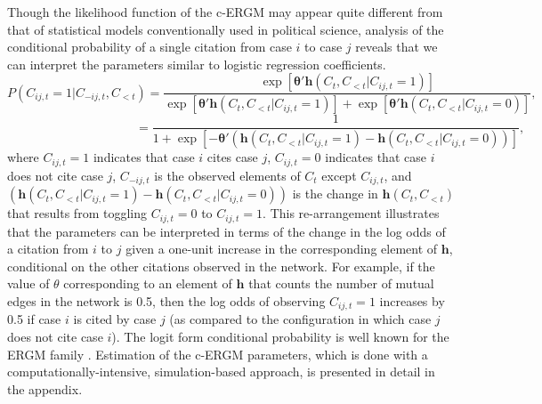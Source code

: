 \documentclass{cup-pan}
\begin{document}
Though the likelihood function of the c-ERGM may appear quite different from that of statistical models conventionally used in political science, analysis of the conditional probability of a single citation from case $i$ to case $j$ reveals that we can interpret the parameters similar to logistic regression coefficients. $$ P(C_{ij,t} = 1 | C_{-ij,t}, C_{ < t}) = \frac{\exp \left[ {\bm{\theta}'\bm{h}(C_{t},C_{<t}| C_{ij,t} = 1) } \right]}{ \exp \left[ {\bm{\theta}'\bm{h}(C_{t},C_{<t}| C_{ij,t} = 1) } \right] + \exp \left[ {\bm{\theta}'\bm{h}(C_{t},C_{<t}| C_{ij,t} = 0) } \right]}, $$ $$ \text{~~~~~~~~~~~~~~~~~~~~~~~~~~~~~~~} = \frac{1}{ 1 + \exp \left[ - {\bm{\theta}'\left(\bm{h}(C_{t},C_{<t}| C_{ij,t} = 1) - \bm{h}(C_{t},C_{<t}| C_{ij,t} = 0)\right)} \right]}, $$
where $C_{ij,t} = 1$ indicates that case $i$ cites case $j$, $C_{ij,t} = 0$ indicates that case $i$ does not cite case $j$, $C_{-ij,t}$ is the observed elements of $C_{t}$ except $C_{ij,t}$, and $\left(\bm{h}(C_{t},C_{<t}| C_{ij,t} = 1) - \bm{h}(C_{t},C_{<t}| C_{ij,t} = 0)\right)$ is the change in $\bm{h}(C_{t},C_{<t})$ that results from toggling $C_{ij,t} = 0$ to $C_{ij,t} = 1$. This re-arrangement illustrates that the parameters can be interpreted in terms of the change in the log odds of a citation from $i$ to $j$ given a one-unit increase in the corresponding element of $\bm{h}$, conditional on the other citations observed in the network. For example, if the value of $\theta$ corresponding to an element of $\bm{h}$ that counts the number of mutual edges in the network is 0.5, then the log odds of observing $C_{ij,t} = 1$ increases by 0.5 if case $i$ is cited by case $j$ (as compared to the configuration in which case $j$ does not cite case $i$). The logit form conditional probability is well known for the ERGM family \citep{goodreau2009birds}. Estimation of the c-ERGM parameters, which is done with a computationally-intensive, simulation-based approach, is presented in detail in the appendix.
\end{document}
